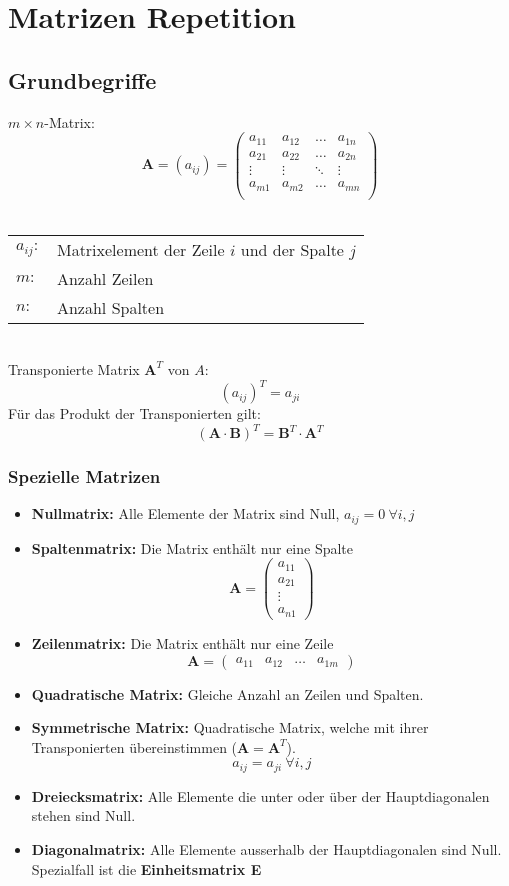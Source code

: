 \chapter{Matrizen Repetition}
\section{Grundbegriffe}
$m\times n$-Matrix:
\[ \textbf{A} = (a_{ij}) = \begin{pmatrix}
	a_{11} & a_{12} & \ldots & a_{1n} \\
	a_{21} & a_{22} & \ldots & a_{2n} \\
	\vdots & \vdots & \ddots & \vdots \\
	a_{m1} & a_{m2} & \ldots & a_{mn} \\
\end{pmatrix} \]
~\\
\begin{footnotesize}
\begin{tabular}{ll}
	$a_{ij}:$	&	Matrixelement der Zeile $i$ und der Spalte $j$\\
	$m:$			& Anzahl Zeilen \\
	$n:$			& Anzahl Spalten
\end{tabular}
\end{footnotesize}
~\\
Transponierte Matrix $\textbf{A}^T$ von $A$:
\[ (a_{ij})^T = a_{ji} \]
Für das Produkt der Transponierten gilt:
\[ (\textbf{A}\cdot\textbf{B})^T=\textbf{B}^T\cdot\textbf{A}^T \]

\subsection{Spezielle Matrizen}
\begin{itemize}
	\item \textbf{Nullmatrix:} Alle Elemente der Matrix sind Null, $a_{ij}=0\ \forall i,j$
	\item \textbf{Spaltenmatrix:} Die Matrix enthält nur eine Spalte
		\[\textbf{A}=\begin{pmatrix} a_{11} \\ a_{21} \\ \vdots \\ a_{n1} \end{pmatrix}\]
	\item \textbf{Zeilenmatrix:} Die Matrix enthält nur eine Zeile
		\[\textbf{A}=\begin{pmatrix} a_{11} & a_{12} & \ldots & a_{1m} \end{pmatrix}\]
	\item \textbf{Quadratische Matrix:} Gleiche Anzahl an Zeilen und Spalten.
	\item \textbf{Symmetrische Matrix:} Quadratische Matrix, welche mit ihrer Transponierten
		übereinstimmen ($\textbf{A}=\textbf{A}^T$).
		\[ a_{ij} = a_{ji}\ \forall i,j \]
	\item \textbf{Dreiecksmatrix:} Alle Elemente die unter oder über der Hauptdiagonalen stehen
		sind Null.
	\item \textbf{Diagonalmatrix:} Alle Elemente ausserhalb der Hauptdiagonalen sind Null.\\
		Spezialfall ist die \textbf{Einheitsmatrix E}
\end{itemize}

